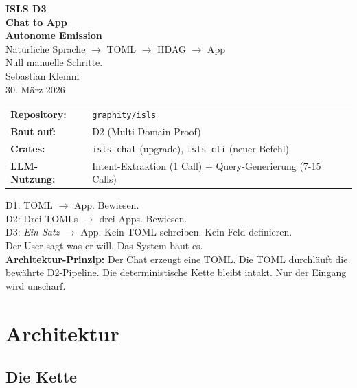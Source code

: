\documentclass[11pt,a4paper]{article}
\begin{document}
\begin{titlepage}
\begin{center}
\vspace*{1.5cm}
{\Huge\bfseries ISLS D3}\\[0.4cm]
{\LARGE\bfseries Chat to App}\\[0.3cm]
{\LARGE\bfseries Autonome Emission}\\[1.2cm]
{\Large Nat\"urliche Sprache $\to$ TOML $\to$ HDAG $\to$ App}\\[0.3cm]
{\Large Null manuelle Schritte.}\\[1.5cm]
{\large Sebastian Klemm}\\[0.3cm]
{\small 30. M\"arz 2026}\\[2cm]

\begin{tabular}{ll}
\textbf{Repository:} & \texttt{graphity/isls} \\
\textbf{Baut auf:} & D2 (Multi-Domain Proof) \\
\textbf{Crates:} & \texttt{isls-chat} (upgrade), \texttt{isls-cli} (neuer Befehl) \\
\textbf{LLM-Nutzung:} & Intent-Extraktion (1 Call) + Query-Generierung (7-15 Calls) \\
\end{tabular}

\vfill
{\small
D1: TOML $\to$ App. Bewiesen.\\
D2: Drei TOMLs $\to$ drei Apps. Bewiesen.\\
D3: \emph{Ein Satz} $\to$ App. Kein TOML schreiben. Kein Feld definieren.\\
Der User sagt was er will. Das System baut es.\\[0.2cm]
\textbf{Architektur-Prinzip:} Der Chat erzeugt eine TOML. Die TOML
durchl\"auft die bewährte D2-Pipeline. Die deterministische Kette
bleibt intakt. Nur der Eingang wird unscharf.
}
\end{center}
\end{titlepage}

\tableofcontents
\newpage

\section{Architektur}

\subsection{Die Kette}
\end{document}
